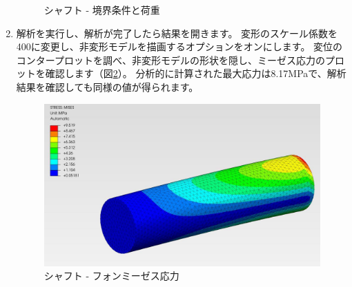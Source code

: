 \begin{enumerate}
\begin{figure}[H]
	\caption{シャフト - 境界条件と荷重}
	\label{fig:02-02}
	\end{figure}
\item
  解析を実行し、解析が完了したら結果を開きます。
  変形のスケール係数を400に変更し、非変形モデルを描画するオプションをオンにします。
  変位のコンタープロットを調べ、非変形モデルの形状を隠し、ミーゼス応力のプロットを確認します（図\ref{fig:02-03}）。
  分析的に計算された最大応力は8.17MPaで、解析結果を確認しても同様の値が得られます。
	\begin{figure}[H]
	\centering
	\includegraphics[width=123mm]{fig/02-03.png}
	\caption{シャフト - フォンミーゼス応力}
	\label{fig:02-03}
	\end{figure}
\end{enumerate}